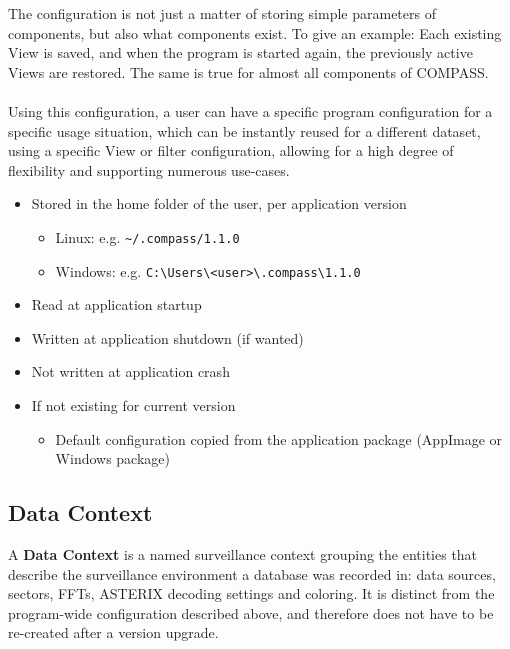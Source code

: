 The configuration is not just a matter of storing simple parameters of components, but also what components exist. To give an example: Each existing View is saved, and when the program is started again, the previously active Views are restored. The same is true for almost all components of COMPASS. \\\\

Using this configuration, a user can have a specific program configuration for a specific usage situation, which can be instantly reused for a different dataset, using a specific View or filter configuration, allowing for a high degree of flexibility and supporting numerous use-cases. \\


\begin{itemize}
\item Stored in the home folder of the user, per application version
\begin{itemize}
\item Linux: e.g. \texttt{\textasciitilde/.compass/1.1.0}
\item Windows: e.g. \texttt{C:\textbackslash Users\textbackslash <user>\textbackslash .compass\textbackslash 1.1.0}
\end{itemize}
\item Read at application startup
\item Written at application shutdown (if wanted)
\item Not written at application crash
\item If not existing for current version
\begin{itemize}
\item Default configuration copied from the application package (AppImage or Windows package)
\end{itemize}
\end{itemize}

\subsection*{Data Context}
A \textbf{Data Context} is a named surveillance context grouping the entities that describe the surveillance environment a database was recorded in: data sources, sectors, FFTs, ASTERIX decoding settings and coloring. It is distinct from the program-wide configuration described above, and 
therefore does not have to be re-created after a version upgrade. \\\\

